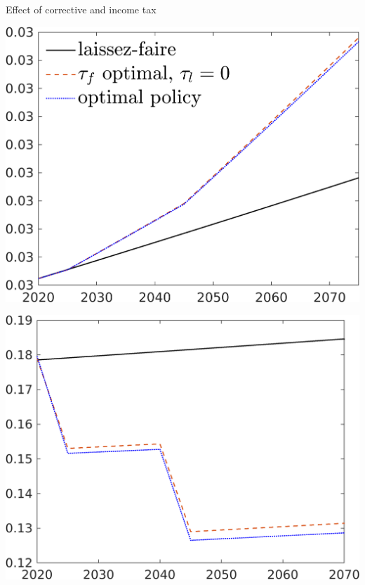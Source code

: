 \documentclass[11pt,aspectratio=169]{beamer}
\begin{document}
\addtocounter{framenumber}{-1}
\begin{frame}{ Effect of corrective and income tax}
	\centering
	\begin{minipage}[]{0.3\textwidth}
		\includegraphics[width=1\textwidth]{../codding_model/own_basedOnFried/optimalPol_elastS_DisuSci/figures/all_1705/CompCounterFac_withLF_taufopt1_taulopt0_AgAf_spillover0_noskill0_sep1_BN0_ineq0_red0_xgrowth0_etaa0.79_lgd1.png}
	\end{minipage}
	\begin{minipage}[]{0.3\textwidth}
		\includegraphics[width=1\textwidth]{../codding_model/own_basedOnFried/optimalPol_elastS_DisuSci/figures/all_1705/CompCounterFac_withLF_taufopt1_taulopt0_gAagg_spillover0_noskill0_sep1_BN0_ineq0_red0_xgrowth0_etaa0.79_lgd0.png}

\end{minipage}
\end{frame}
\end{document}
